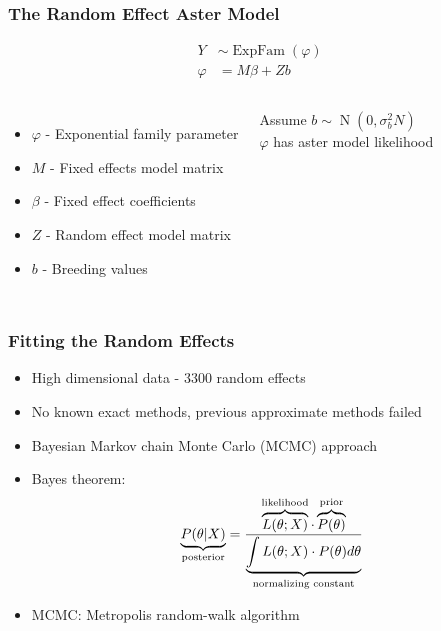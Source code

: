 \documentclass[table]{beamer}
\DeclareMathOperator{\Norm}{N}
\DeclareMathOperator{\ExpFam}{ExpFam}
\begin{document}
\begin{frame}
  \frametitle{The Random Effect Aster Model}
  \begin{align*}
    Y &\sim \ExpFam(\varphi) \\
    \varphi &= M \beta + Z b
  \end{align*}
  \begin{columns}[c]
  \begin{itemize}
    \item $\varphi$ - Exponential family parameter
    \item $M$ - Fixed effects model matrix
    \item $\beta$ -  Fixed effect coefficients
    \item $Z$ - Random effect model matrix
    \item $b$ - Breeding values
  \end{itemize}
  Assume $ b \sim \Norm\left(0, \sigma_b^2 N \right)$  \\
  $\varphi$ has aster model likelihood
  \end{columns}
\end{frame}

\begin{frame}
  \frametitle{Fitting the Random Effects}
  \begin{itemize}
    \item High dimensional data - $3300$ random effects
    \item No known exact methods, previous approximate methods failed
    \item Bayesian Markov chain Monte Carlo (MCMC) approach
    \item Bayes theorem: 
  \begin{equation*}
    \label{eqn:bayes_rule}
  \underbrace{P(\theta|X)}_\text{posterior} = 
  \frac{%
    \overbrace{%
      L(\theta;X)}^\text{likelihood}
    \cdot 
    \overbrace{P(\theta)}^\text{prior}
  }{%
    \underbrace{%
      \int L(\theta;X)\cdot P(\theta) d\theta}_\text{normalizing constant}
  }
  \end{equation*}
    \item MCMC: Metropolis random-walk algorithm \\
  \end{itemize}
\end{frame}
\end{document}
